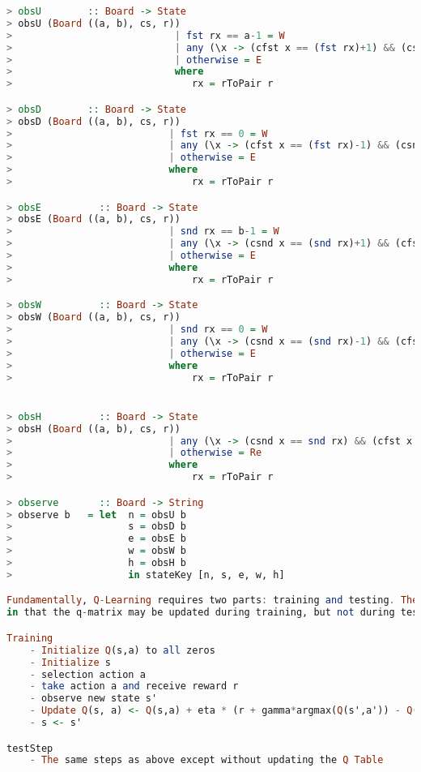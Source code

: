 \documentclass[12pt,a4paper]{article}
\begin{document}
\begin{lstlisting}[language=Haskell,numbers=none,basicstyle=\tiny]
> obsU        :: Board -> State
> obsU (Board ((a, b), cs, r))
>                            | fst rx == a-1 = W
>                            | any (\x -> (cfst x == (fst rx)+1) && (csnd x == snd rx)) cs = C
>                            | otherwise = E
>                            where 
>                               rx = rToPair r

> obsD        :: Board -> State
> obsD (Board ((a, b), cs, r))
>                           | fst rx == 0 = W
>                           | any (\x -> (cfst x == (fst rx)-1) && (csnd x == snd rx)) cs = C
>                           | otherwise = E
>                           where
>                               rx = rToPair r

> obsE          :: Board -> State 
> obsE (Board ((a, b), cs, r))
>                           | snd rx == b-1 = W
>                           | any (\x -> (csnd x == (snd rx)+1) && (cfst x == fst rx)) cs = C
>                           | otherwise = E
>                           where
>                               rx = rToPair r

> obsW          :: Board -> State 
> obsW (Board ((a, b), cs, r))
>                           | snd rx == 0 = W
>                           | any (\x -> (csnd x == (snd rx)-1) && (cfst x == fst rx)) cs = C
>                           | otherwise = E
>                           where
>                               rx = rToPair r


> obsH          :: Board -> State 
> obsH (Board ((a, b), cs, r))
>                           | any (\x -> (csnd x == snd rx) && (cfst x == fst rx)) cs = Rc
>                           | otherwise = Re
>                           where
>                               rx = rToPair r

> observe       :: Board -> String
> observe b   = let  n = obsU b
>                    s = obsD b
>                    e = obsE b
>                    w = obsW b
>                    h = obsH b
>                    in stateKey [n, s, e, w, h]

Fundamentally, Q-Learning requires two parts: training and testing. These parts differ
in that the q-matrix may be updated during training, but not during testing.

Training 
    - Initialize Q(s,a) to all zeros
    - Initialize s
    - selection action a
    - take action a and receive reward r
    - observe new state s'
    - Update Q(s, a) <- Q(s,a) + eta * (r + gamma*argmax(Q(s',a')) - Q(s,a))
    - s <- s'

testStep
    - The same steps as above except without updating the Q Table


\end{lstlisting}
\end{document}
